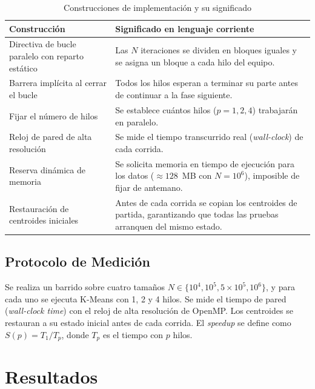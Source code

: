 \documentclass[conference]{IEEEtran}
\begin{document}
\begin{table}[H]
  \centering
  \caption{Construcciones de implementaci\'on y su significado}
  \label{tab:traduccion}
  \begin{tabular}{p{}p{}}
    \toprule
    \textbf{Construcci\'on} & \textbf{Significado en lenguaje corriente} \\
    \midrule
    Directiva de bucle paralelo con reparto est\'atico
      & Las $N$ iteraciones se dividen en bloques iguales y se asigna un bloque
        a cada hilo del equipo. \\
    Barrera impl\'icita al cerrar el bucle
      & Todos los hilos esperan a terminar su parte antes de continuar a la
        fase siguiente. \\
    Fijar el n\'umero de hilos
      & Se establece cu\'antos hilos ($p = 1, 2, 4$) trabajar\'an en paralelo. \\
    Reloj de pared de alta resoluci\'on
      & Se mide el tiempo transcurrido real (\emph{wall-clock}) de cada corrida. \\
    Reserva din\'amica de memoria
      & Se solicita memoria en tiempo de ejecuci\'on para los datos
        ($\approx 128$~MB con $N{=}10^6$), imposible de fijar de antemano. \\
    Restauraci\'on de centroides iniciales
      & Antes de cada corrida se copian los centroides de partida, garantizando
        que todas las pruebas arranquen del mismo estado. \\
    \bottomrule
  \end{tabular}
\end{table}

\subsection{Protocolo de Medici\'on}

Se realiza un barrido sobre cuatro tama\~nos
$N \in \{10^4, 10^5, 5{\times}10^5, 10^6\}$, y para cada uno se ejecuta
K-Means con 1, 2 y 4 hilos.
Se mide el tiempo de pared (\emph{wall-clock time}) con el reloj de alta
resoluci\'on de OpenMP.
Los centroides se restauran a su estado inicial antes de cada corrida.
El \emph{speedup} se define como $S(p) = T_1 / T_p$, donde $T_p$ es el tiempo
con $p$ hilos.

\section{Resultados}
\label{sec:resultados}
\end{document}
